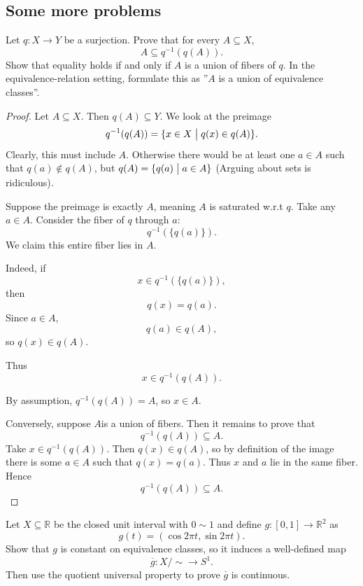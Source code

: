 \documentclass[11pt]{article}
\begin{document}
\subsection{Some more problems}

\begin{prob}
    Let $q: X \to Y$ be a surjection. 
    Prove that for every $A \subseteq X$, 
    \[
        A \subseteq q^{-1}(q(A)). 
    \]
    Show that equality holds if and only if 
    $A$ is a union of fibers of $q$. 
    In the equivalence-relation setting, formulate 
    this as ''$A$ is a union of equivalence classes''. 
\end{prob}
\begin{proof}
    Let $A \subseteq X$. 
    Then $q(A) \subseteq Y$. 
    We look at the preimage 
    \[
        q^{-1}(q(A)) = \{x \in X \bigm| q(x) \in q(A)\}. 
    \]
    Clearly, this must include $A$. Otherwise 
    there would be at least one $a \in A$ such that 
    $q(a)\not\in q(A)$, but $q(A) = \{q(a) \bigm| a \in A\}$ 
    (Arguing about sets is ridiculous).

    Suppose the preimage is exactly $A$, meaning 
    $A$ is saturated w.r.t $q$. 
    Take any $a \in A$. Consider the fiber of $q$ 
    through $a$: 
    \[
        q^{-1}(\{q(a)\}). 
    \]
    We claim this entire fiber lies in $A$. 
    
    Indeed, if 
    \[
        x \in 
        q^{-1}(\{q(a)\}), 
    \]
    then 
    \[
        q(x) = q(a). 
    \]
    Since $a \in A$, 
    \[
        q(a) \in q(A),  
    \]
    so $q(x) \in q(A)$. 

    Thus 
    \[
        x \in q^{-1}(q(A)). 
    \]

    By assumption, $q^{-1}(q(A)) = A$, so $x \in A$. 

    Conversely, suppose $A$is a union of 
    fibers. 
    Then it remains to prove that 
    \[
        q^{-1}(q(A)) \subseteq A. 
    \]
    Take $x \in q^{-1}(q(A))$. 
    Then $q(x) \in q(A)$, 
    so by definition of the image there is some 
    $a \in A$ such that $q(x) = q(a)$. 
    Thus $x$ and $a$ lie in the same fiber. 
    Hence 
    \[
        q^{-1}(q(A)) \subseteq A. 
    \]
\end{proof}

\begin{prob}
    Let $X \subseteq \mathbb R$ be the 
    closed unit interval with $0 \sim 1$ 
    and define $g : [0,1] \to \mathbb R^2$ as 
    \[
        g(t) = (\cos 2\pi t, \sin 2\pi t). 
    \]
    Show that $g$ is constant on equivalence classes, 
    so it induces a well-defined map 
    \[
        \overline g : X / \sim \to S^1.
    \]
    Then use the quotient universal property to 
    prove $\overline g$ is continuous. 
\end{prob}
\end{document}
